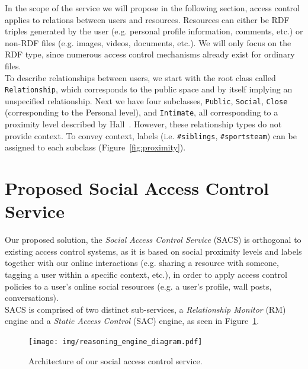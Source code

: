 In the scope of the service we will propose in the following section, access control applies to relations between users and resources. Resources can either be RDF triples generated by the user (e.g. personal profile information, comments, etc.) or non-RDF files (e.g. images, videos, documents, etc.). We will only focus on the RDF type, since numerous access control mechanisms already exist for ordinary files.\\

To describe relationships between users, we start with the root class called \verb+Relationship+, which corresponds to the public space and by itself implying an unspecified relationship. Next we have four subclasses, \verb+Public+, \verb+Social+, \verb+Close+ (corresponding to the Personal level), and \verb+Intimate+, all corresponding to a proximity level described by Hall~\cite{edward1966hall}. However, these relationship types do not provide context. To convey context, labels (i.e. \verb+#siblings+, \verb+#sportsteam+) can be assigned to each subclass (Figure~\ref{fig:proximity}).\\

\section{Proposed Social Access Control Service}
\label{sec:sacs}
Our proposed solution, the \textit{Social Access Control Service} (SACS) is orthogonal to existing access control systems, as it is based on social proximity levels and labels together with our online interactions (e.g. sharing a resource with someone, tagging a user within a specific context, etc.), in order to apply access control policies to a user's online social resources (e.g. a user's profile, wall posts, conversations).\\

SACS is comprised of two distinct sub-services, a \textit{Relationship Monitor} (RM) engine and a \textit{Static Access Control} (SAC) engine, as seen in Figure~\ref{fig:acs_architecture}.\\

\begin{figure}[h]
  \begin{center}
    \texttt{[image: img/reasoning\_engine\_diagram.pdf]}
        \caption{Architecture of our social access control service.}
        \label{fig:acs_architecture}
  \end{center}
\end{figure}

